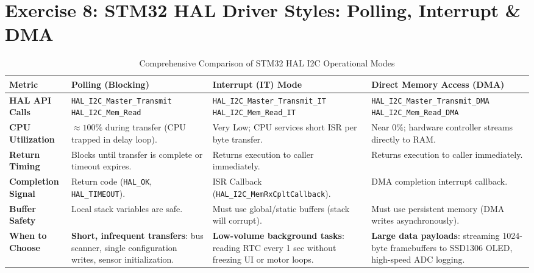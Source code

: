 \documentclass[11pt,a4paper]{article}
\begin{document}
\section*{Exercise 8: STM32 HAL Driver Styles: Polling, Interrupt \& DMA}

\begin{table}[h!]
\centering
\small
\caption{Comprehensive Comparison of STM32 HAL I2C Operational Modes}
\vspace{4pt}
\begin{tabularx}{\textwidth}{l p{3.8cm} p{4.2cm} p{4.2cm}}
\toprule
\textbf{Metric} & \textbf{Polling (Blocking)} & \textbf{Interrupt (IT) Mode} & \textbf{Direct Memory Access (DMA)} \\
\midrule
\textbf{HAL API Calls} & \texttt{HAL\_I2C\_Master\_Transmit} \texttt{HAL\_I2C\_Mem\_Read} & \texttt{HAL\_I2C\_Master\_Transmit\_IT} \texttt{HAL\_I2C\_Mem\_Read\_IT} & \texttt{HAL\_I2C\_Master\_Transmit\_DMA} \texttt{HAL\_I2C\_Mem\_Read\_DMA} \\
\midrule
\textbf{CPU Utilization} & $\approx 100\%$ during transfer (CPU trapped in delay loop). & Very Low; CPU services short ISR per byte transfer. & Near $0\%$; hardware controller streams directly to RAM. \\
\midrule
\textbf{Return Timing} & Blocks until transfer is complete or timeout expires. & Returns execution to caller immediately. & Returns execution to caller immediately. \\
\midrule
\textbf{Completion Signal} & Return code (\texttt{HAL\_OK}, \texttt{HAL\_TIMEOUT}). & ISR Callback (\texttt{HAL\_I2C\_MemRxCpltCallback}). & DMA completion interrupt callback. \\
\midrule
\textbf{Buffer Safety} & Local stack variables are safe. & Must use global/static buffers (stack will corrupt). & Must use persistent memory (DMA writes asynchronously). \\
\midrule
\textbf{When to Choose} & \textbf{Short, infrequent transfers}: bus scanner, single configuration writes, sensor initialization. & \textbf{Low-volume background tasks}: reading RTC every 1 sec without freezing UI or motor loops. & \textbf{Large data payloads}: streaming 1024-byte framebuffers to SSD1306 OLED, high-speed ADC logging. \\
\bottomrule
\end{tabularx}
\end{table}
\end{document}
